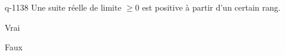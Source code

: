 \begin{truefalse}{q-1138}
Une suite réelle de limite $\geq 0$ est positive à partir d'un certain rang.
\item Vrai
\item* Faux
\end{truefalse}

